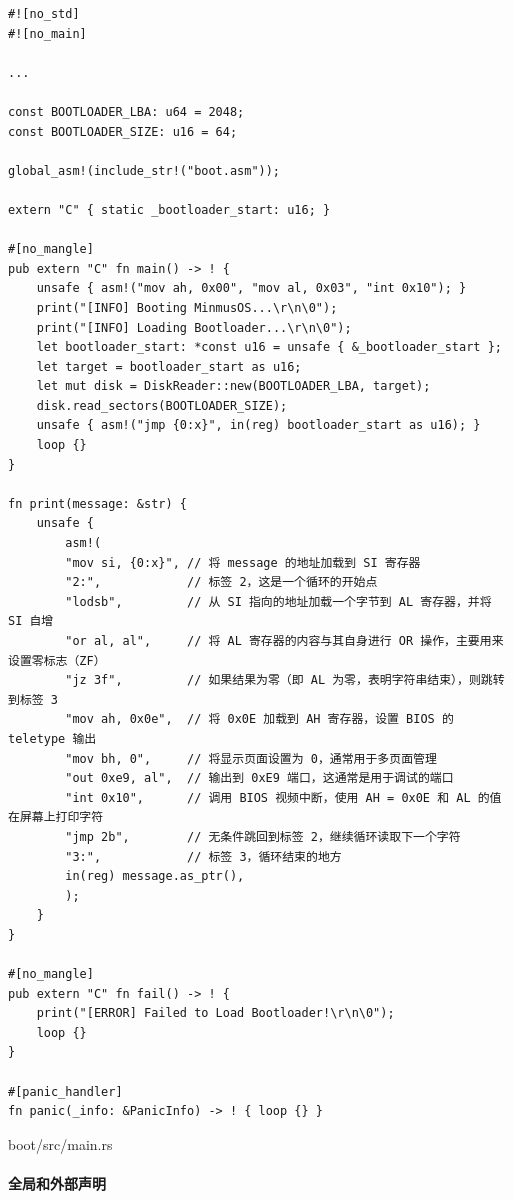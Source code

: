 \begin{listing}[htbp]
    \begin{verbatim}
#![no_std]
#![no_main]

...

const BOOTLOADER_LBA: u64 = 2048;
const BOOTLOADER_SIZE: u16 = 64;

global_asm!(include_str!("boot.asm"));

extern "C" { static _bootloader_start: u16; }

#[no_mangle]
pub extern "C" fn main() -> ! {
    unsafe { asm!("mov ah, 0x00", "mov al, 0x03", "int 0x10"); }
    print("[INFO] Booting MinmusOS...\r\n\0");
    print("[INFO] Loading Bootloader...\r\n\0");
    let bootloader_start: *const u16 = unsafe { &_bootloader_start };
    let target = bootloader_start as u16;
    let mut disk = DiskReader::new(BOOTLOADER_LBA, target);
    disk.read_sectors(BOOTLOADER_SIZE);
    unsafe { asm!("jmp {0:x}", in(reg) bootloader_start as u16); }
    loop {}
}

fn print(message: &str) {
    unsafe {
        asm!(
        "mov si, {0:x}", // 将 message 的地址加载到 SI 寄存器
        "2:",            // 标签 2，这是一个循环的开始点
        "lodsb",         // 从 SI 指向的地址加载一个字节到 AL 寄存器，并将 SI 自增
        "or al, al",     // 将 AL 寄存器的内容与其自身进行 OR 操作，主要用来设置零标志（ZF）
        "jz 3f",         // 如果结果为零（即 AL 为零，表明字符串结束），则跳转到标签 3
        "mov ah, 0x0e",  // 将 0x0E 加载到 AH 寄存器，设置 BIOS 的 teletype 输出
        "mov bh, 0",     // 将显示页面设置为 0，通常用于多页面管理
        "out 0xe9, al",  // 输出到 0xE9 端口，这通常是用于调试的端口
        "int 0x10",      // 调用 BIOS 视频中断，使用 AH = 0x0E 和 AL 的值在屏幕上打印字符
        "jmp 2b",        // 无条件跳回到标签 2，继续循环读取下一个字符
        "3:",            // 标签 3，循环结束的地方
        in(reg) message.as_ptr(),
        );
    }
}

#[no_mangle]
pub extern "C" fn fail() -> ! {
    print("[ERROR] Failed to Load Bootloader!\r\n\0");
    loop {}
}

#[panic_handler]
fn panic(_info: &PanicInfo) -> ! { loop {} }
    \end{verbatim}
    \caption{boot/src/main.rs}\label{lst:BootSrcMain}
\end{listing}

\paragraph{全局和外部声明}

